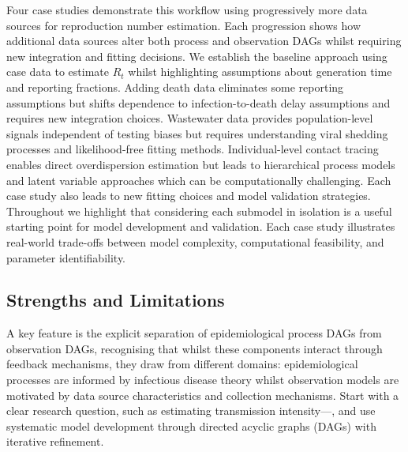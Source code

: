 \documentclass{article}
\begin{document}
Four case studies demonstrate this workflow using progressively more data sources for reproduction number estimation.
Each progression shows how additional data sources alter both process and observation DAGs whilst requiring new integration and fitting decisions.
We establish the baseline approach using case data to estimate $R_t$ whilst highlighting assumptions about generation time and reporting fractions.
Adding death data eliminates some reporting assumptions but shifts dependence to infection-to-death delay assumptions and requires new integration choices.
Wastewater data provides population-level signals independent of testing biases but requires understanding viral shedding processes and likelihood-free fitting methods.
Individual-level contact tracing enables direct overdispersion estimation but leads to hierarchical process models and latent variable approaches which can be computationally challenging.
Each case study also leads to new fitting choices and model validation strategies.
Throughout we highlight that considering each submodel in isolation is a useful starting point for model development and validation.
Each case study illustrates real-world trade-offs between model complexity, computational feasibility, and parameter identifiability.


 







\subsection{Strengths and Limitations}

A key feature is the explicit separation of epidemiological process DAGs from observation DAGs, recognising that whilst these components interact through feedback mechanisms, they draw from different domains: epidemiological processes are informed by infectious disease theory whilst observation models are motivated by data source characteristics and collection mechanisms.
Start with a clear research question, such as estimating transmission intensity—, and use systematic model development through directed acyclic graphs (DAGs) with iterative refinement.
\end{document}
